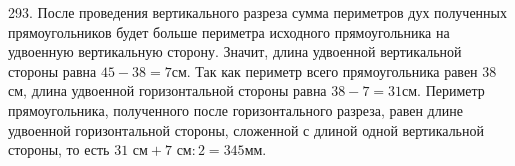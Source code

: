 293. После проведения вертикального разреза сумма периметров дух полученных прямоугольников будет больше периметра исходного прямоугольника на удвоенную вертикальную сторону. Значит, длина удвоенной вертикальной стороны равна $45-38=7$см. Так как периметр всего прямоугольника равен 38 см, длина удвоенной горизонтальной стороны равна $38-7=31$см. Периметр прямоугольника, полученного после горизонтального разреза, равен длине удвоенной горизонтальной стороны, сложенной с длиной одной вертикальной стороны, то есть $31\text{ см}+7\text{ см}:2=345$мм.\\
